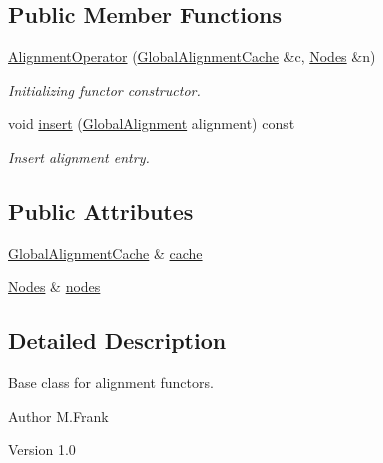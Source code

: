 \subsection*{Public Member Functions}
\begin{DoxyCompactItemize}
\item 
\hyperlink{class_d_d4hep_1_1_alignments_1_1_alignment_operator_a46730d86c085b06213e2d18714df0c02}{AlignmentOperator} (\hyperlink{class_d_d4hep_1_1_alignments_1_1_global_alignment_cache}{GlobalAlignmentCache} \&c, \hyperlink{class_d_d4hep_1_1_alignments_1_1_alignment_operator_a2f25eae1d38abc30a09f7a840ab0662a}{Nodes} \&n)
\begin{DoxyCompactList}\small\item\em Initializing functor constructor. \item\end{DoxyCompactList}\item 
void \hyperlink{class_d_d4hep_1_1_alignments_1_1_alignment_operator_ad23641b687f526eb9ad3984dfc289e61}{insert} (\hyperlink{class_d_d4hep_1_1_alignments_1_1_global_alignment}{GlobalAlignment} alignment) const 
\begin{DoxyCompactList}\small\item\em Insert alignment entry. \item\end{DoxyCompactList}\end{DoxyCompactItemize}
\subsection*{Public Attributes}
\begin{DoxyCompactItemize}
\item 
\hyperlink{class_d_d4hep_1_1_alignments_1_1_global_alignment_cache}{GlobalAlignmentCache} \& \hyperlink{class_d_d4hep_1_1_alignments_1_1_alignment_operator_a931deb1a003ec4c619fae0b0d728f8d2}{cache}
\item 
\hyperlink{class_d_d4hep_1_1_alignments_1_1_alignment_operator_a2f25eae1d38abc30a09f7a840ab0662a}{Nodes} \& \hyperlink{class_d_d4hep_1_1_alignments_1_1_alignment_operator_a3af1a13de9f4772b04471070b6b99676}{nodes}
\end{DoxyCompactItemize}


\subsection{Detailed Description}
Base class for alignment functors. \begin{DoxyAuthor}{Author}
M.Frank 
\end{DoxyAuthor}
\begin{DoxyVersion}{Version}
1.0 
\end{DoxyVersion}


